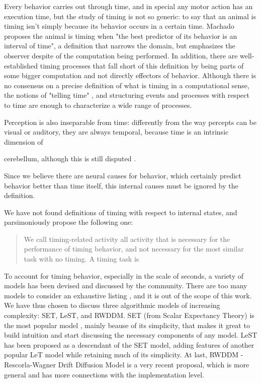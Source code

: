     Every behavior carries out through time, and in special any motor action has an execution time, but the study of timing is not so generic: to say that an animal is timing isn't simply because its behavior occurs in a certain time. Machado \cite{machado2009learning} proposes the animal is timing when "the best predictor of its behavior is an interval of time", a definition that narrows the domain, but emphasizes the observer despite of the computation being performed. In addition, there are well-established timing processes that fall short of this definition by being parts of some bigger computation and not directly effectors of behavior. Although there is no consensus on a precise definition of what is timing in a computational sense, the notions of "telling time" \cite{}, and structuring events and processes with respect to time \cite{} are enough to characterize a wide range of processes.
    
    
    Perception is also inseparable from time: differently from the way percepts can be visual or auditory, they are always temporal, because time is an intrinsic dimension of  
 
 
    cerebellum, although this is still disputed \cite{ohmae2017cerebellar, nichelli1996perceptual}.
 
    Since we believe there are neural causes for behavior, which certainly predict behavior better than time itself, this internal causes must be ignored by the definition. 
 
    We have not found definitions of timing with respect to internal states, and parsimoniously propose the following one: 
    \begin{quote}
    We call timing-related activity all activity that is necessary for the performance of timing behavior, and not necessary for the most similar task with no timing.
    A timing task is 
    \end{quote}
    
    
        To account for timing behavior, especially in the scale of seconds, a variety of models has been devised and discussed by the community. There are too many models to consider an exhaustive listing \cite{}, and it is out of the scope of this work. We have thus chosen to discuss three algorithmic models of increasing complexity: SET, LeST, and RWDDM. SET (from Scalar Expectancy Theory) is the most popular model \cite{}, mainly beause of its simplicity, that makes it great to build intuition and start discussing the necessary components of any model. LeST has been proposed as a descendant of the SET model, adding features of another popular LeT model while retaining much of its simplicity. At last, RWDDM - Rescorla-Wagner Drift Diffusion Model is a very recent proposal, which is more general and has more connections with the implementation level.
    
